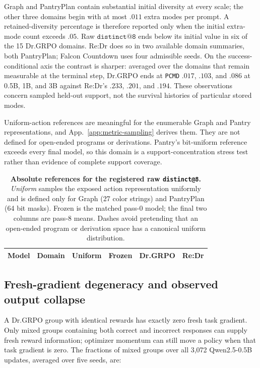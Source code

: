 \documentclass{article}
\makeatletter
\newcommand{\1}{\mathbf 1}
\newcommand{\pmd}{\texttt{PCMD}}
\newcommand{\distk}{\texttt{distinct@8}}
\theoremstyle{remark}
\theoremstyle{definition}
\theoremstyle{plain}
\makeatother
\begin{document}
Graph and PantryPlan contain substantial initial diversity at every scale;
the other three domains begin with at most $.011$ extra modes per prompt.
A retained-diversity percentage is therefore reported only when the initial
extra-mode count exceeds $.05$. Raw $\texttt{distinct@8}$ ends below its
initial value in six of the 15 Dr.GRPO domains. Re:Dr does so in
two available domain summaries, both PantryPlan; Falcon Countdown uses
four admissible seeds. On the success-conditional axis the contrast is
sharper: averaged over the domains that remain measurable at the terminal
step, Dr.GRPO ends at \pmd{} $.017$, $.103$, and $.086$ at 0.5B, 1B, and 3B
against Re:Dr's $.233$, $.201$, and $.194$. These observations concern
sampled held-out support, not the survival histories of particular stored
modes.

Uniform-action references are meaningful for the enumerable Graph and
Pantry representations, and App.~\ref{app:metric-sampling} derives them. They
are not defined for open-ended programs or derivations. Pantry's bit-uniform reference exceeds every final model, so
this domain is a support-concentration stress test rather than evidence
of complete support coverage.

\begin{table}[t]
  \centering
  \caption{\textbf{Absolute references for the registered raw \distk{}.}
  \emph{Uniform} samples the exposed action representation uniformly and is
  defined only for Graph (27 color strings) and PantryPlan (64 bit masks).
  Frozen is the matched pass-0 model; the final two columns are pass-8 means.
  Dashes avoid pretending that an open-ended program or derivation space has a
  canonical uniform distribution.}
  \label{tab:absolute-support-references}
  \scriptsize
  \setlength{\tabcolsep}{4.2pt}
  \begin{tabular}{@{}llrrrr@{}}
    \toprule
    \textbf{Model} & \textbf{Domain} & \textbf{Uniform} & \textbf{Frozen}
      & \textbf{Dr.GRPO} & \textbf{Re:Dr} \\
    \midrule
    
  \end{tabular}
\end{table}


\subsection{Fresh-gradient degeneracy and observed output collapse}
\label{app:degenerate-groups}

A Dr.GRPO group with identical rewards has exactly zero fresh task gradient.
Only mixed groups containing both correct and incorrect responses can
supply fresh reward information; optimizer momentum can still move a
policy when that task gradient is zero. The fractions of mixed groups
over all 3,072 Qwen2.5-0.5B updates, averaged over five seeds, are:
\end{document}
